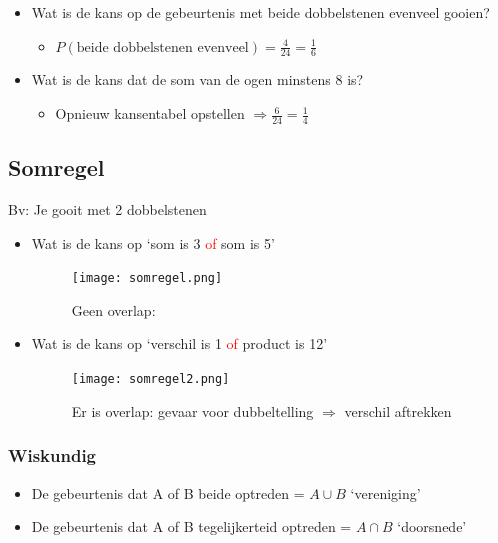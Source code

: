 \documentclass{article}
\begin{document}
\begin{itemize}
    \item Wat is de kans op de gebeurtenis met beide dobbelstenen evenveel gooien?
    \begin{itemize}
        \begin{figure}[H]
            \centering
            \texttt{[image: gecombineerd-experiment-oef1.png]}
            \caption{Kansentabel opstellen}
        \end{figure}
        \item $P(\text{beide dobbelstenen evenveel}) = \frac{4}{24} = \frac{1}{6}$
    \end{itemize}
    \item Wat is de kans dat de som van de ogen minstens 8 is?
    \begin{itemize}
        \item Opnieuw kansentabel opstellen $\Rightarrow \frac{6}{24} = \frac{1}{4}$ 
    \end{itemize}
\end{itemize}

\subsection{Somregel}

Bv: Je gooit met 2 dobbelstenen

\begin{itemize}
    \item Wat is de kans op `som is 3 \textcolor{red}{of} som is 5'
    \begin{figure}[H]
        \centering
        \texttt{[image: somregel.png]}
        \caption{Geen overlap: }
    \end{figure}
    
    \item Wat is de kans op `verschil is 1 \textcolor{red}{of} product is 12'
    \begin{figure}[H]
        \centering
        \texttt{[image: somregel2.png]}
        \caption{Er is overlap: gevaar voor dubbeltelling $\Rightarrow$ verschil aftrekken}
    \end{figure}
\end{itemize}

\subsubsection{Wiskundig}

\begin{itemize}
    \item De gebeurtenis dat A of B beide optreden = $A \cup B$ `vereniging'
    \item De gebeurtenis dat A of B tegelijkerteid optreden = $A \cap B$ `doorsnede'
\end{itemize}
\end{document}
